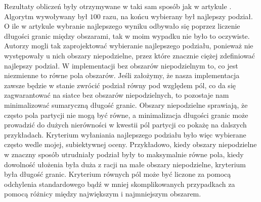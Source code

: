 Rezultaty obliczeń były otrzymywane w taki sam sposób jak w artykule \cite{1364754}.
Algorytm wywoływany był $100$ razu, na końcu wybierany był najlepszy podział.
O ile w artykule \cite{1364754} wybranie najlepszego wyniku odbywało się poprzez liczenie długości granic między obszarami,
tak w moim wypadku nie było to oczywiste.
Autorzy \cite{1364754} mogli tak zaprojektować wybieranie najlepszego podziału, ponieważ nie występowały u nich
obszary niepodzielne, przez które znacznie ciężej zdefiniować najlepszy podział.
W implementacji bez obszarów niepodzielnym to, co jest niezmienne to równe pola obszarów.
Jeśli założymy, że nasza implementacja zawsze będzie w stanie zwrócić podział równy pod względem pól,
co da się zagwarantować na siatce bez obszarów niepodzielnych, to pozostaje nam minimalizować sumaryczną długość granic.
Obszary niepodzielne sprawiają, że często pola partycji nie mogą być równe, a minimalizacja długości granic może
prowadzić do dużych nierówności w kwestii pól partycji co pokażę na dalszych przykładach.
Kryterium wyłaniania najlepszego podziału było więc wybierane często wedle mojej, subiektywnej oceny.
Przykładowo, kiedy obszary niepodzielne w znaczny sposób utrudniały podział były to maksymalnie równe pola,
kiedy dowolność ułożenia była duża z racji na małe obszary niepodzielne, kryterium była długość granic.
Kryterium równych pól może być liczone za pomocą odchylenia standardowego bądź w mniej skomplikowanych przypadkach
za pomocą różnicy między największym i najmniejszym obszarem.